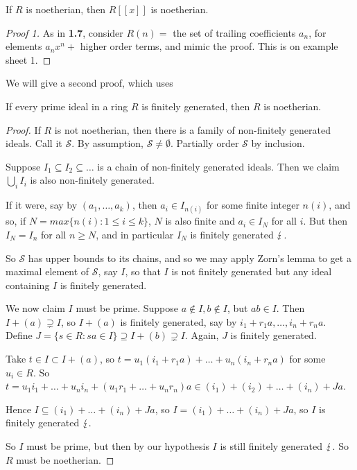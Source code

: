\documentclass[10pt,a4paper]{article}
\begin{document}
\begin{theorem}
  If $R$ is noetherian, then $R[[x]]$ is noetherian.
\end{theorem}
\begin{proof}[Proof 1]
  As in \textbf{1.7}, consider $R(n) =$ the set of trailing coefficients $a_n$, for elements $a_nx^n +$ higher order terms, and mimic the proof. This is on example sheet 1.
\end{proof}
We will give a second proof, which uses
\begin{theorem}
  If every prime ideal in a ring $R$ is finitely generated, then $R$ is noetherian.
\end{theorem}
\begin{proof}
  If $R$ is not noetherian, then there is a family of non-finitely generated ideals. Call it $\mathscr{S}$. By assumption, $\mathscr{S} \neq \emptyset$. Partially order $\mathscr{S}$ by inclusion.

  Suppose $I_1 \subseteq I_2 \subseteq \ldots$ is a chain of non-finitely generated ideals. Then we claim $\bigcup_i I_i$ is also non-finitely generated.

  If it were, say by $(a_1, \ldots, a_k)$, then $a_i \in I_{n(i)}$ for some finite integer $n(i)$, and so, if $N = max \{n(i) : 1\leq i \leq k\}$, $N$ is also finite and $a_i \in I_N$ for all $i$. But then $I_N = I_n$ for all $n \geq N$, and in particular $I_N$ is finitely generated $\lightning$.

  So $\mathscr{S}$ has upper bounds to its chains, and so we may apply Zorn's lemma to get a maximal element of $\mathscr{S}$, say $I$, so that $I$ is not finitely generated but any ideal containing $I$ is finitely generated.

  We now claim $I$ must be prime. Suppose $a \notin I, b \notin I$, but $ab \in I$. Then $I + (a) \supsetneq I$, so $I + (a)$ is finitely generated, say by $i_1 + r_1a, \ldots, i_n + r_na$. Define $J = \{s \in R : sa \in I\} \supseteq I+(b)\supsetneq I$. Again, $J$ is finitely generated.

  Take $t \in I \subset I+(a)$, so $t = u_1(i_1+r_1a) + \ldots + u_n(i_n+r_n a)$ for some $u_i \in R$. So $t = u_1i_1 + \ldots +u_ni_n + (u_1r_1 + \ldots +u_nr_n)a \in (i_1) + (i_2) + \ldots + (i_n) + Ja$.

  Hence $I \subseteq (i_1) + \ldots + (i_n) + Ja$, so $I = (i_1) + \ldots + (i_n) + Ja$, so $I$ is finitely generated $\lightning.$

  So $I$ must be prime, but then by our hypothesis $I$ is still finitely generated $\lightning$. So $R$ must be noetherian.
\end{proof}
\end{document}
